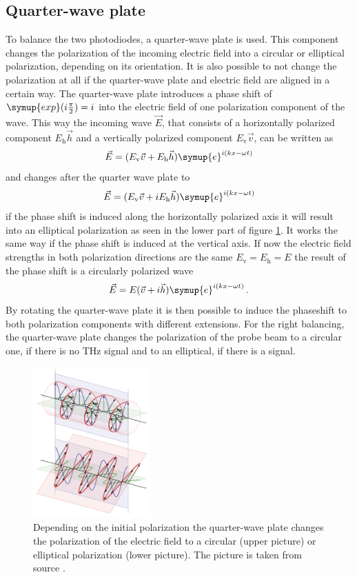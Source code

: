 \FloatBarrier
\subsection{Quarter-wave plate}
\label{sec:qwp}
To balance the two photodiodes, a quarter-wave plate is used.
This component changes the polarization of the incoming electric field into a circular or elliptical polarization, depending on its orientation.
It is also possible to not change the polarization at all if the quarter-wave plate and electric field are aligned in a certain way.
The quarter-wave plate introduces a phase shift of $\symup{exp}(i\frac{\pi}{2}) = i$ into the electric field of one polarization component of the wave.
This way the incoming wave $\vec{E}$, that consists of a horizontally polarized component $E_\text{h}\vec{h}$ and a vertically polarized component $E_\text{v}\vec{v}$, can be written as
\begin{equation}
    \vec{E} = (E_\text{v}\vec{v} + E_\text{h}\vec{h})\symup{e}^{i(kx-\omega t)}
\end{equation}
and changes after the quarter wave plate to 
\begin{equation}
    \vec{E} = (E_\text{v}\vec{v} + i E_\text{h}\vec{h})\symup{e}^{i(kx-\omega t)}
\end{equation}
if the phase shift is induced along the horizontally polarized axis it will result into an elliptical polarization as seen in the lower part of figure \ref{fig:qwp}.
It works the same way if the phase shift is induced at the vertical axis.
If now the electric field strengths in both polarization directions are the same $E_\text{v} = E_\text{h} = E$ the result of the phase shift is a circularly polarized wave \cite{born_wolf_2019}
\begin{equation}
    \vec{E} = E(\vec{v} + i\vec{h})\symup{e}^{i(kx-\omega t)} \, .
\end{equation}
By rotating the quarter-wave plate it is then possible to induce the phaseshift to both polarization components with different extensions.
For the right balancing, the quarter-wave plate changes the polarization of the probe beam to a circular one, if there is no $\si{\tera\hertz}$ signal and to an elliptical, if there is a signal.
\begin{figure}
    \centering
    \includegraphics[width=0.4\textwidth]{refferenced_pic/qwp.png}
    \caption{Depending on the initial polarization the quarter-wave plate changes the polarization of the electric field to a circular (upper picture) or elliptical polarization (lower picture).
    The picture is taken from source \cite{qwp}.}
    \label{fig:qwp}
\end{figure}
